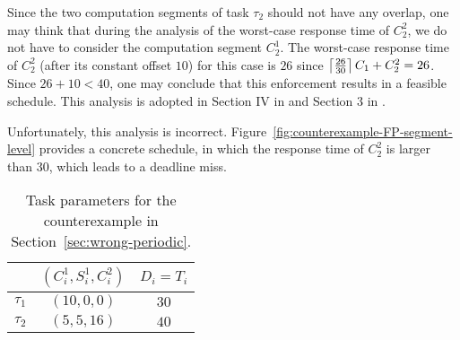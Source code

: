 Since the two computation segments of task $\tau_2$ should not have any overlap, one may think that during the analysis of the worst-case response time of $C_2^2$, we do not have to consider the computation segment $C_2^1$. The worst-case response time of $C_2^2$ (after its constant offset $10$) for this case is $26$ since $\left\lceil{\frac{26}{30}}\right\rceil C_1 + C_2^2 = 26$. 
Since $26+10 < 40$, one may conclude that this enforcement results in a feasible schedule. This analysis is adopted in Section IV in \cite{RTSS-KimANR13} and Section 3 in \cite{DBLP:journals/ieicet/DingTT09}. 

Unfortunately, this analysis is incorrect.
Figure~\ref{fig:counterexample-FP-segment-level} provides a concrete schedule, in which the response time of $C_2^2$ is larger than $30$, which leads to a deadline miss.

\begin{table} [t]
\centering
    \begin{tabular}{|c|c|c|}
 \hline
        & $(C_i^1, S_i^1, C_i^2)$ &  $D_i=T_i$\\ 
        \hline
        $\tau_1$ & $(10, 0, 0)$ &  $30$\\ 
        $\tau_2$ &  $(5, 5, 16)$ & $40$  \\ 
        \hline
    \end{tabular} 
    \caption{Task parameters for the counterexample in Section~\ref{sec:wrong-periodic}.}
    \label{table:ex-periodic}
\end{table}


